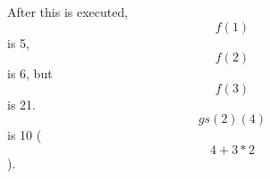 \begin{enumerate}
\begin{enumerate}
	After this is executed, \[f(1)\] is 5, \[f(2)\] is 6,
	but \[f(3)\] is 21.
	\[gs(2)(4)\] is 10 (\[4+3*2\]).
%
%
%
	\end{enumerate}
\end{enumerate}


